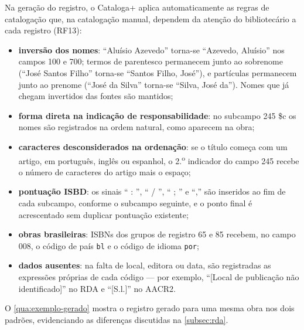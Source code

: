 Na geração do registro, o Cataloga+ aplica automaticamente as regras de catalogação que, na catalogação manual, dependem da atenção do bibliotecário a cada registro (RF13):

\begin{itemize}
    \item \textbf{inversão dos nomes}: ``Aluísio Azevedo'' torna-se ``Azevedo, Aluísio'' nos campos 100 e 700; termos de parentesco permanecem junto ao sobrenome (``José Santos Filho'' torna-se ``Santos Filho, José''), e partículas permanecem junto ao prenome (``José da Silva'' torna-se ``Silva, José da''). Nomes que já chegam invertidos das fontes são mantidos;
    \item \textbf{forma direta na indicação de responsabilidade}: no subcampo 245 \$c os nomes são registrados na ordem natural, como aparecem na obra;
    \item \textbf{caracteres desconsiderados na ordenação}: se o título começa com um artigo, em português, inglês ou espanhol, o 2.\textsuperscript{o} indicador do campo 245 recebe o número de caracteres do artigo mais o espaço;
    \item \textbf{pontuação ISBD}: os sinais `` : '', `` / '', `` ; '' e ``,'' são inseridos ao fim de cada subcampo, conforme o subcampo seguinte, e o ponto final é acrescentado sem duplicar pontuação existente;
    \item \textbf{obras brasileiras}: ISBNs dos grupos de registro 65 e 85 recebem, no campo 008, o código de país \texttt{bl} e o código de idioma \texttt{por};
    \item \textbf{dados ausentes}: na falta de local, editora ou data, são registradas as expressões próprias de cada código --- por exemplo, ``[Local de publicação não identificado]'' no RDA e ``[S.l.]'' no AACR2.
\end{itemize}

O \autoref{qua:exemplo-gerado} mostra o registro gerado para uma mesma obra nos dois padrões, evidenciando as diferenças discutidas na \autoref{subsec:rda}.

